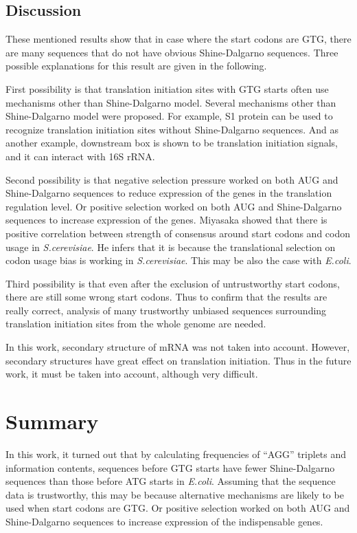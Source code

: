 \subsection{Discussion}

These mentioned results show that in case where the start codons are
GTG, there are many sequences that do not have obvious Shine-Dalgarno
sequences. Three possible explanations for this result are given in
the following.

First possibility is that translation initiation sites with GTG starts
often use mechanisms other than Shine-Dalgarno model. Several 
mechanisms other than Shine-Dalgarno model were proposed. For example,
S1 protein can be used to recognize translation initiation sites without
Shine-Dalgarno sequences\cite{lts11}. And as another example,
downstream box is shown to be translation initiation signals, and it
can interact with 16S rRNA\cite{ldbox3}.

Second possibility is that negative selection pressure worked on both
AUG and Shine-Dalgarno sequences to reduce expression of the genes in
the translation regulation level. Or positive selection worked on both
AUG and Shine-Dalgarno sequences to increase expression of the
genes. Miyasaka\cite{label5551} showed that there is positive
correlation between strength of consensus around start codons and
codon usage in {\it S.cerevisiae}. He infers that it is because the
translational selection on codon usage bias is working in {\it S.cerevisiae}.
This may be also the case with {\it E.coli}.

Third possibility is that even after the exclusion of untrustworthy
start codons, there are still some wrong start codons.  Thus to
confirm that the results are really correct, analysis of many
trustworthy unbiased sequences surrounding translation initiation
sites from the whole genome are needed.

In this work, secondary structure of mRNA was not taken into
account. However, secondary structures have great effect on
translation initiation\cite{lsstr1}. Thus in the future work, it must
be taken into account, although very difficult.  

\section{Summary} 

In this work, it turned out that by calculating frequencies of ``AGG''
triplets and information contents, sequences before GTG starts have
fewer Shine-Dalgarno sequences than those before ATG starts in {\it
E.coli}. Assuming that the sequence data is trustworthy, this may be
because alternative mechanisms are likely to be used when start codons
are GTG. Or positive selection worked on both AUG and Shine-Dalgarno
sequences to increase expression of the indispensable genes.

